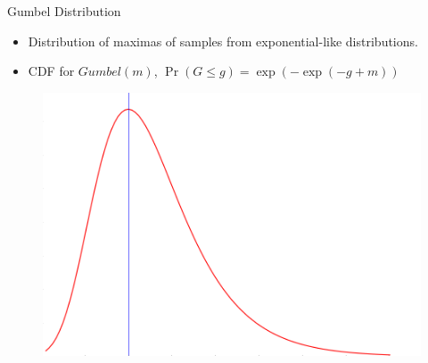 \begin{frame}[label=framelabel]{Gumbel Distribution}
  \begin{itemize}[<+->]
  \item Distribution of maximas of samples from exponential-like distributions.
  \item CDF for $Gumbel(m)$, $\Pr(G\le g) = \exp(-\exp(-g+m))$
  \end{itemize}
      \begin{figure}
      \centering
        \includegraphics[scale=0.2]{images/gumbel_2.png}
    \end{figure}   

\end{frame}

